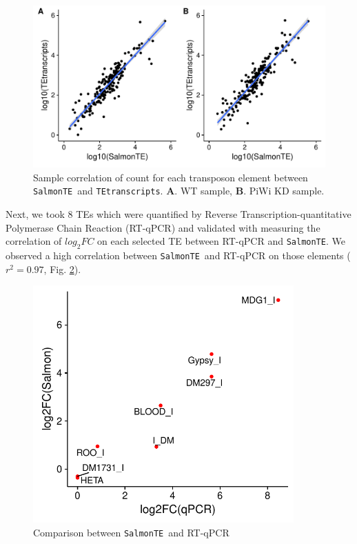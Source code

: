 \documentclass{ws-procs11x85}
\newcommand{\TEtranscripts}{\texttt{TEtranscripts}}
\newcommand{\SalmonTE}{\texttt{SalmonTE}}
\begin{document}
\begin{figure}[h]
\centerline{
\includegraphics[width=13cm]{figure_corr_count}
}
\caption{Sample correlation of count for each transposon element between \SalmonTE~and \TEtranscripts. \textbf{A}. WT sample, \textbf{B}. PiWi KD sample.}
\label{aba:fig3}
\end{figure}

Next, we took 8 TEs which were quantified by
Reverse Transcription-quantitative Polymerase Chain Reaction (RT-qPCR)
and validated with measuring the correlation of $log_{2}FC$ on each selected TE between RT-qPCR and \SalmonTE.
We observed a high correlation between \SalmonTE~and RT-qPCR on those elements ($r^2=0.97$, Fig. \ref{aba:fig4}). 

\begin{figure}[h]
\centerline{
\includegraphics[width=10cm]{supp_fig3_corr}
}
\caption{Comparison between \SalmonTE~and RT-qPCR}
\label{aba:fig4}
\end{figure}
\end{document}
